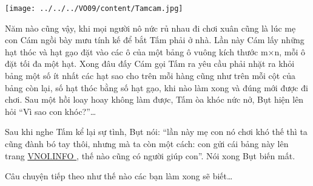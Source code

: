 \texttt{[image: ../../../VO09/content/Tamcam.jpg]}

       Năm nào cũng vậy, khi mọi người nô nức rủ nhau đi chơi xuân cũng là lúc mẹ con Cám ngồi bày mưu tính kế để bắt Tấm phải ở nhà. Lần này Cám lấy những hạt thóc và hạt gạo đặt vào các ô của một bảng ô vuông kích thước m×n, mỗi ô đặt tối đa một hạt. Xong đâu đấy Cám gọi Tấm ra yêu cầu phải nhặt ra khỏi bảng một số ít nhất các hạt sao cho trên mỗi hàng cũng như trên mỗi cột của bảng còn lại, số hạt thóc bằng số hạt gạo, khi nào làm xong và đúng mới được đi chơi. Sau một hồi loay hoay không làm được, Tấm òa khóc nức nở, Bụt hiện lên hỏi “Vì sao con khóc?”…      

       Sau khi nghe Tấm kể lại sự tình, Bụt nói: “lần này mẹ con nó chơi khó thế thì ta cũng đành bó tay thôi, nhưng mà ta còn một cách: con gửi cái bảng này lên trang       \href{http://vnoi.info/}{        VNOI.INFO       }       , thế nào cũng có người giúp con”. Nói xong Bụt biến mất.      

       Câu chuyện tiếp theo như thế nào các bạn làm xong sẽ biết…      

\